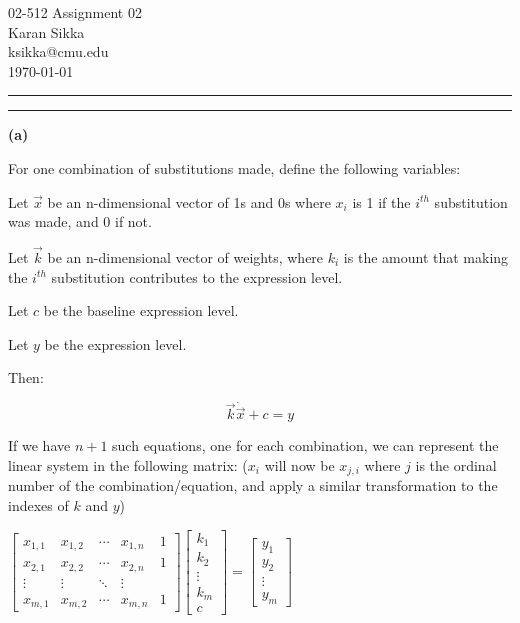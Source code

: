 \documentclass[11pt,letterpaper]{article}
\makeatletter
\newcommand{\question}[1] {\vspace{.25in} \hrule\vspace{0.5em}
\noindent{\bf #1} \vspace{0.5em}
\hrule \vspace{.10in}}
\renewcommand{\part}[1] {\vspace{.10in} {\bf (#1)}}
\newcommand{\myname}{Karan Sikka}
\newcommand{\myandrew}{ksikka@cmu.edu}
\newcommand{\myhwnum}{02}
\makeatother
\begin{document}
\medskip

\thispagestyle{plain}
\begin{center}                  %
{\Large 02-512 Assignment \myhwnum} \\
\myname \\
\myandrew \\
\today
\end{center}

\question{1}

\part{a}

For one combination of substitutions made, define the following variables:

Let $\vec{x}$ be an n-dimensional vector of 1s and 0s where $x_i$ is 1
if the $i^{th}$ substitution was made, and 0 if not.

Let $\vec{k}$ be an n-dimensional vector of weights, where $k_i$ is the amount
that making the $i^{th}$ substitution contributes to the expression level.

Let $c$ be the baseline expression level.

Let $y$ be the expression level.

Then:

$$\vec{k} \dot \vec{x} + c = y$$

If we have $n+1$ such equations, one for each combination, we can represent the linear
system in the following matrix: ($x_i$ will now be $x_{j,i}$ where $j$ is the ordinal number of the combination/equation, and apply a similar transformation to the indexes of $k$ and $y$)

$
 \begin{bmatrix}
  x_{1,1} & x_{1,2} & \cdots & x_{1,n} & 1\\
  x_{2,1} & x_{2,2} & \cdots & x_{2,n} & 1\\
  \vdots  & \vdots  & \ddots & \vdots  \\
  x_{m,1} & x_{m,2} & \cdots & x_{m,n} & 1
 \end{bmatrix}
 \begin{bmatrix}
  k_{1} \\
  k_{2} \\
  \vdots  \\
  k_{m} \\
  c
 \end{bmatrix}
 =
 \begin{bmatrix}
  y_{1} \\
  y_{2} \\
  \vdots  \\
  y_{m}
 \end{bmatrix}
$
\end{document}
